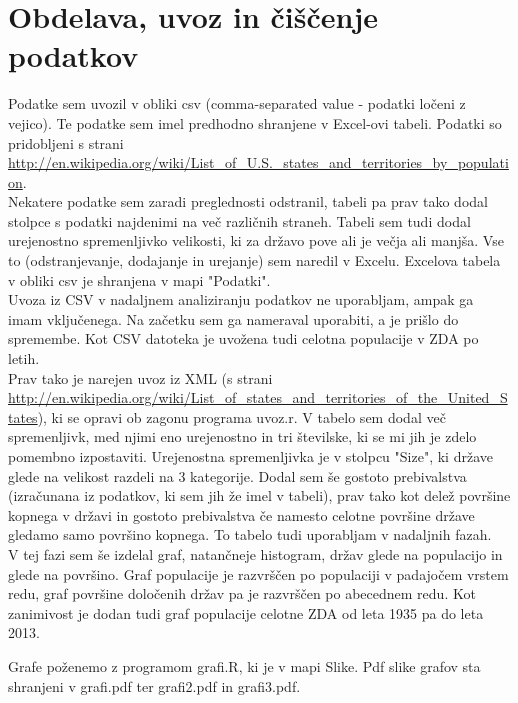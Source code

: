 \documentclass[11pt,a4paper]{article}
\begin{document}
\pagebreak

\section{Obdelava, uvoz in čiščenje podatkov}

Podatke sem uvozil v obliki csv (comma-separated value - podatki ločeni z vejico). Te podatke sem imel predhodno shranjene v Excel-ovi tabeli. Podatki so pridobljeni s strani \url{http://en.wikipedia.org/wiki/List_of_U.S._states_and_territories_by_population}. \\

Nekatere podatke sem zaradi preglednosti odstranil, tabeli pa prav tako dodal stolpce s podatki najdenimi na več različnih straneh. Tabeli sem tudi dodal urejenostno spremenljivko velikosti, ki za državo pove ali je večja ali manjša. Vse to (odstranjevanje, dodajanje in urejanje) sem naredil v Excelu. Excelova tabela v obliki csv je shranjena v mapi "Podatki".\\

Uvoza iz CSV v nadaljnem analiziranju podatkov ne uporabljam, ampak ga imam vključenega. Na začetku sem ga nameraval uporabiti, a je prišlo do spremembe.
Kot CSV datoteka je uvožena tudi celotna populacije v ZDA po letih.\\

Prav tako je narejen uvoz iz XML (s strani \url{http://en.wikipedia.org/wiki/List_of_states_and_territories_of_the_United_States}), ki se opravi ob zagonu programa uvoz.r. V tabelo sem dodal več spremenljivk, med njimi eno urejenostno in tri številske, ki se mi jih je zdelo pomembno 
izpostaviti. Urejenostna spremenljivka je v stolpcu "Size", ki države glede na velikost razdeli na 3 kategorije. Dodal sem še gostoto prebivalstva (izračunana iz podatkov, ki sem jih že imel v tabeli), prav tako kot delež površine kopnega v državi in gostoto prebivalstva če namesto celotne površine države gledamo samo površino kopnega. To tabelo tudi uporabljam v nadaljnih fazah.\\

V tej fazi sem še izdelal graf, natančneje histogram, držav glede na populacijo in glede na površino.
Graf populacije je razvrščen po populaciji v padajočem vrstem redu, graf površine določenih držav pa je razvrščen po abecednem redu.
Kot zanimivost je dodan tudi graf populacije celotne ZDA od leta 1935 pa do leta 2013. 

Grafe poženemo z programom grafi.R, ki je v mapi Slike. Pdf slike grafov sta shranjeni v 
grafi.pdf ter grafi2.pdf in grafi3.pdf.
\end{document}
